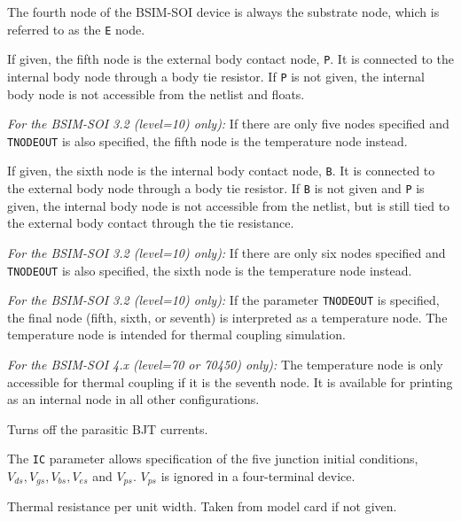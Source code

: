 \begin{Device}
\begin{Parameters}


The fourth node of the BSIM-SOI device is always the substrate node,
which is referred to as the \texttt{E} node. 


If given, the fifth node is the external body contact node,
\texttt{P}.  It is connected to the internal body node through a body
tie resistor.  If \texttt{P} is not given, the internal body node is
not accessible from the netlist and floats.

{\em For the BSIM-SOI 3.2 (level=10) only):} If there are only five
nodes specified and \texttt{TNODEOUT} is also specified, the fifth
node is the temperature node instead.


If given, the sixth node is the internal body contact node, \texttt{B}.  It is
connected to the external body node through a body tie resistor.  If \texttt{B}
is not given and \texttt{P} is given, the internal body node is not accessible
from the netlist, but is still tied to the external body contact through the
tie resistance.

{\em For the BSIM-SOI 3.2 (level=10) only):} If there are only six
nodes specified and \texttt{TNODEOUT} is also specified, the sixth
node is the temperature node instead.


{\em For the BSIM-SOI 3.2 (level=10) only):} If the parameter \texttt{TNODEOUT} is specified, the final node (fifth, sixth,
or seventh) is interpreted as a temperature node.  The temperature node is
intended for thermal coupling simulation.

{\em For the BSIM-SOI 4.x (level=70 or 70450) only):} The temperature
node is only accessible for thermal coupling if it is the seventh
node.  It is available for printing as an internal node in all other
configurations.

Turns off the parasitic BJT currents.

The \texttt{IC} parameter allows specification of the five junction initial
conditions, $V_{ds}, V_{gs}, V_{bs}, V_{es}$ and $V_{ps}$.  $V_{ps}$ is ignored
in a four-terminal device.

Thermal resistance per unit width.  Taken from model card if not given.


\end{Parameters}
\end{Device}
